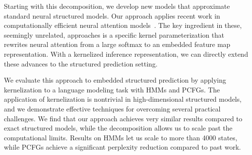 \documentclass{article}
\newcommand\todo[1]{\textcolor{red}{#1}}
\begin{document}
Starting with this decomposition, we develop new models that approximate
standard neural structured models. Our approach applies recent work in
computationally efficient neural attention models~\citep{peng2021rfa,choromanski2020performer}. The key
ingredient in these, seemingly unrelated, approaches is a specific
kernel parameterization that rewrites neural attention from a large
softmax to an embedded feature map representation. With a kernelized
inference representation, we can directly extend these advances to the
structured prediction setting.

We evaluate this approach to embedded structured prediction by
applying kernelization to a language modeling task with HMMs and PCFGs. The application of kernelization is
nontrivial in high-dimensional structured models, and we demonstrate
effective techniques for overcoming several practical challenges. We find that our approach achieves
very similar results compared to exact structured models, while the
decomposition allows us to scale past the computational limits.
Results on HMMs let us scale to more than 4000 states, while PCFGs achieve 
a significant perplexity reduction compared to past work. 













\end{document}
